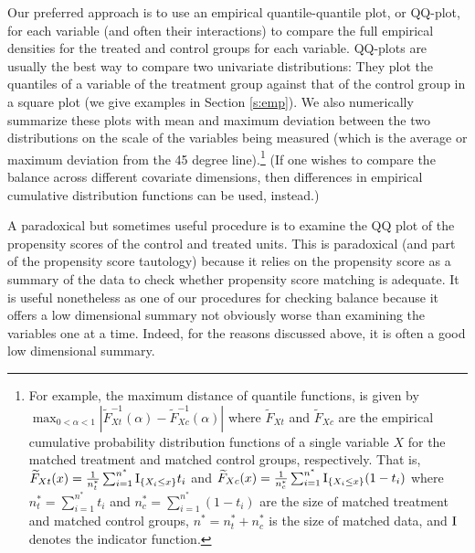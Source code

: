 \documentclass[11pt,titlepage]{article}
\begin{document}
Our preferred approach is to use an empirical quantile-quantile plot,
or QQ-plot, for each variable (and often their interactions) to
compare the full empirical densities for the treated and control
groups for each variable.  QQ-plots are usually the best way to
compare two univariate distributions: They plot the quantiles of a
variable of the treatment group against that of the control group in a
square plot (we give examples in Section \ref{s:emp}).  We also
numerically summarize these plots with mean and maximum deviation
between the two distributions on the scale of the variables being
measured (which is the average or maximum deviation from the 45 degree
line).\footnote{For example, the maximum distance of quantile
  functions, is given by $\max_{0 < \alpha < 1}
  |\widetilde{F}_{Xt}^{-1}(\alpha)-\widetilde{F}^{-1}_{Xc}(\alpha)|$
  where $\widetilde{F}_{Xt}$ and $\widetilde{F}_{Xc}$ are the
  empirical cumulative probability distribution functions of a single
  variable $X$ for the matched treatment and matched control groups,
  respectively. That is, $\widetilde{F}_{Xt}(x)=\frac{1}{n^*_t}
  \sum_{i=1}^{n^*} {\rm I}_{\{X_i \le x\}} t_i$ and
  $\widetilde{F}_{Xc}(x)=\frac{1}{n^*_c} \sum_{i=1}^{n^*} {\rm
    I}_{\{X_i \le x\}} (1-t_i)$ where $n^*_t=\sum_{i=1}^{n^*} t_i$ and
  $n^*_c=\sum_{i=1}^{n^*} (1-t_i)$ are the size of matched treatment
  and matched control groups, $n^*=n^*_t + n^*_c$ is the size of
  matched data, and ${\rm I}$ denotes the indicator function.} (If one
wishes to compare the balance across different covariate dimensions,
then differences in empirical cumulative distribution functions can be
used, instead.)

A paradoxical but sometimes useful procedure is to examine the QQ plot
of the propensity scores of the control and treated units.  This is
paradoxical (and part of the propensity score tautology) because it
relies on the propensity score as a summary of the data to check
whether propensity score matching is adequate.  It is useful
nonetheless as one of our procedures for checking balance because it
offers a low dimensional summary not obviously worse than 
examining the variables one at a time.  Indeed, for the reasons discussed
above, it is often a good low dimensional summary.
\end{document}
